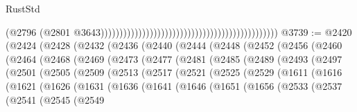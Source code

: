 \begin{lexlean}{RustStd}
\begin{coremodule}
{\begin{coremodule}
{{{{{{{{{{{{{{{{{{{{{{{{{{{{{{{{{{{{{{{{{{{{{{{{{{{{{{{{{{{{{{{{{{{{                                                                                              (@2796
                                                                                                (@2801
                                                                                                  @3643)))))))))))))))))))))))))))))))))))))))))))))))
@3739 := @2420
    (@2424
      (@2428
        (@2432
          (@2436
            (@2440
              (@2444
                (@2448
                  (@2452
                    (@2456
                      (@2460
                        (@2464
                          (@2468
                            (@2469
                              (@2473
                                (@2477
                                  (@2481
                                    (@2485
                                      (@2489
                                        (@2493
                                          (@2497
                                            (@2501
                                              (@2505
                                                (@2509
                                                  (@2513
                                                    (@2517
                                                      (@2521
                                                        (@2525
                                                          (@2529
                                                            (@1611
                                                              (@1616
                                                                (@1621
                                                                  (@1626
                                                                    (@1631
                                                                      (@1636
                                                                        (@1641
                                                                          (@1646
                                                                            (@1651
                                                                              (@1656
                                                                                (@2533
                                                                                  (@2537
                                                                                    (@2541
                                                                                      (@2545
                                                                                        (@2549
}}}}}}}}}}}}}}}}}}}}}}}}}}}}}}}}}}}}}}}}}}}}}}}}}}}}}}}}}}}}}}}}}}}}
\end{coremodule}}
\end{coremodule}
\end{lexlean}
